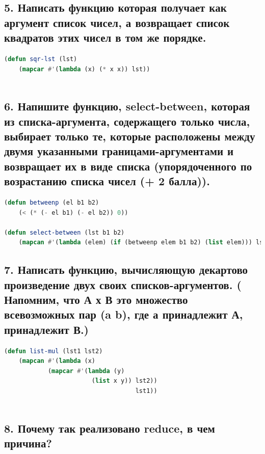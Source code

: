 \documentclass[12pt]{report}
\begin{document}
\subsection*{5. Написать функцию которая получает как аргумент список чисел, а возвращает список
	квадратов этих чисел в том же порядке.}

\begin{lstlisting}[label=6xd, caption=Решение задания №5, language=lisp]
(defun sqr-lst (lst) 
	(mapcar #'(lambda (x) (* x x)) lst))
	
\end{lstlisting}

\subsection*{6.  Напишите функцию, select-between, которая из списка-аргумента, содержащего только
	числа, выбирает только те, которые расположены между двумя указанными границами-аргументами и возвращает их в виде списка (упорядоченного по возрастанию списка чисел
	(+ 2 балла)).}

\begin{lstlisting}[label=6xd, caption=Решение задания №6, language=lisp]
(defun betweenp (el b1 b2)
	(< (* (- el b1) (- el b2)) 0))

(defun select-between (lst b1 b2)
	(mapcan #'(lambda (elem) (if (betweenp elem b1 b2) (list elem))) lst))

\end{lstlisting}

\subsection*{7. Написать функцию, вычисляющую декартово произведение двух своих списков-аргументов. ( Напомним, что А х В это множество всевозможных пар (a b), где а
	принадлежит А, принадлежит В.)}

\begin{lstlisting}[label=6xd, caption=Решение задания №7, language=lisp]	
(defun list-mul (lst1 lst2)
	(mapcan #'(lambda (x)
			(mapcar #'(lambda (y)
						(list x y)) lst2))
									lst1))
	
\end{lstlisting}

\subsection*{8. Почему так реализовано reduce, в чем причина?}
\end{document}
